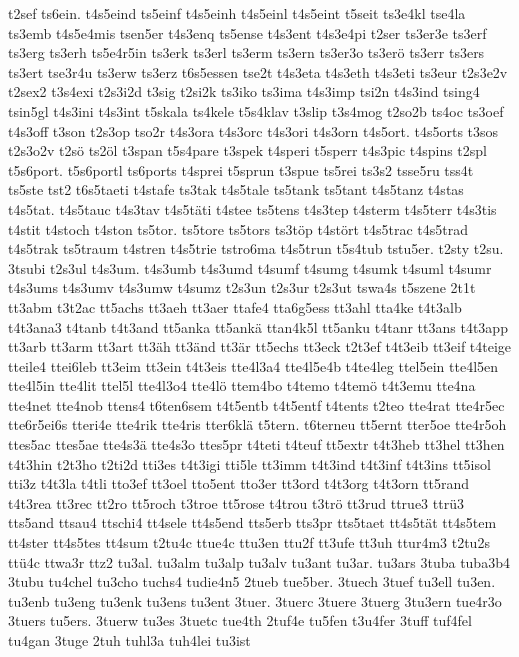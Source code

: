 {t2sef
ts6ein.
t4s5eind
ts5einf
t4s5einh
t4s5einl
t4s5eint
t5seit
ts3e4kl
tse4la
ts3emb
t4s5e4mis
tsen5er
t4s3enq
ts5ense
t4s3ent
t4s3e4pi
t2ser
ts3er3e
ts3erf
ts3erg
ts3erh
ts5e4r5in
ts3erk
ts3erl
ts3erm
ts3ern
ts3er3o
ts3erö
ts3err
ts3ers
ts3ert
tse3r4u
ts3erw
ts3erz
t6s5essen
tse2t
t4s3eta
t4s3eth
t4s3eti
ts3eur
t2s3e2v
t2sex2
t3s4exi
t2s3i2d
t3sig
t2si2k
ts3iko
ts3ima
t4s3imp
tsi2n
t4s3ind
tsing4
tsin5gl
t4s3ini
t4s3int
t5skala
ts4kele
t5s4klav
t3slip
t3s4mog
t2so2b
ts4oc
ts3oef
t4s3off
t3son
t2s3op
tso2r
t4s3ora
t4s3orc
t4s3ori
t4s3orn
t4s5ort.
t4s5orts
t3sos
t2s3o2v
t2sö
ts2öl
t3span
t5s4pare
t3spek
t4speri
t5sperr
t4s3pic
t4spins
t2spl
t5s6port.
t5s6portl
ts6ports
t4sprei
t5sprun
t3spue
ts5rei
ts3s2
tsse5ru
tss4t
ts5ste
tst2
t6s5taeti
t4stafe
ts3tak
t4s5tale
ts5tank
ts5tant
t4s5tanz
t4stas
t4s5tat.
t4s5tauc
t4s3tav
t4s5täti
t4stee
ts5tens
t4s3tep
t4sterm
t4s5terr
t4s3tis
t4stit
t4stoch
t4ston
ts5tor.
ts5tore
ts5tors
ts3töp
t4stört
t4s5trac
t4s5trad
t4s5trak
ts5traum
t4stren
t4s5trie
tstro6ma
t4s5trun
t5s4tub
tstu5er.
t2sty
t2su.
3tsubi
t2s3ul
t4s3um.
t4s3umb
t4s3umd
t4sumf
t4sumg
t4sumk
t4suml
t4sumr
t4s3ums
t4s3umv
t4s3umw
t4sumz
t2s3un
t2s3ur
t2s3ut
tswa4s
t5szene
2t1t
tt3abm
t3t2ac
tt5achs
tt3aeh
tt3aer
ttafe4
tta6g5ess
tt3ahl
tta4ke
t4t3alb
t4t3ana3
t4tanb
t4t3and
tt5anka
tt5ankä
ttan4k5l
tt5anku
t4tanr
tt3ans
t4t3app
tt3arb
tt3arm
tt3art
tt3äh
tt3änd
tt3är
tt5echs
tt3eck
t2t3ef
t4t3eib
tt3eif
t4teige
tteile4
ttei6leb
tt3eim
tt3ein
t4t3eis
tte4l3a4
tte4l5e4b
t4te4leg
ttel5ein
tte4l5en
tte4l5in
tte4lit
ttel5l
tte4l3o4
tte4lö
ttem4bo
t4temo
t4temö
t4t3emu
tte4na
tte4net
tte4nob
ttens4
t6ten6sem
t4t5entb
t4t5entf
t4tents
t2teo
tte4rat
tte4r5ec
tte6r5ei6s
tteri4e
tte4rik
tte4ris
tter6klä
t5tern.
t6terneu
tt5ernt
tter5oe
tte4r5oh
ttes5ac
ttes5ae
tte4s3ä
tte4s3o
ttes5pr
t4teti
t4teuf
tt5extr
t4t3heb
tt3hel
tt3hen
t4t3hin
t2t3ho
t2ti2d
tti3es
t4t3igi
tti5le
tt3imm
t4t3ind
t4t3inf
t4t3ins
tt5isol
tti3z
t4t3la
t4tli
tto3ef
tt3oel
tto5ent
tto3er
tt3ord
t4t3org
t4t3orn
tt5rand
t4t3rea
tt3rec
tt2ro
tt5roch
t3troe
tt5rose
t4trou
t3trö
tt3rud
ttrue3
ttrü3
tts5and
ttsau4
ttschi4
tt4sele
tt4s5end
tts5erb
tts3pr
tts5taet
tt4s5tät
tt4s5tem
tt4ster
tt4s5tes
tt4sum
t2tu4c
ttue4c
ttu3en
ttu2f
tt3ufe
tt3uh
ttur4m3
t2tu2s
ttü4c
ttwa3r
ttz2
tu3al.
tu3alm
tu3alp
tu3alv
tu3ant
tu3ar.
tu3ars
3tuba
tuba3b4
3tubu
tu4chel
tu3cho
tuchs4
tudie4n5
2tueb
tue5ber.
3tuech
3tuef
tu3ell
tu3en.
tu3enb
tu3eng
tu3enk
tu3ens
tu3ent
3tuer.
3tuerc
3tuere
3tuerg
3tu3ern
tue4r3o
3tuers
tu5ers.
3tuerw
tu3es
3tuetc
tue4th
2tuf4e
tu5fen
t3u4fer
3tuff
tuf4fel
tu4gan
3tuge
2tuh
tuhl3a
tuh4lei
tu3ist
}
